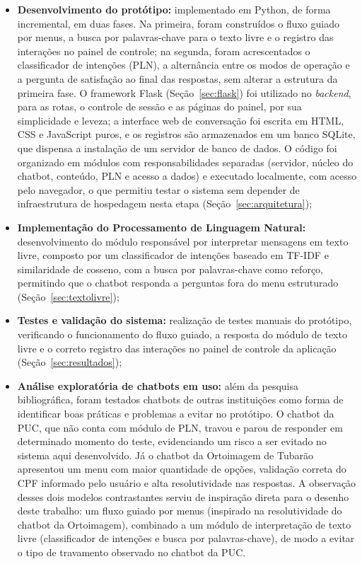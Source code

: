 \documentclass[12pt]{article}
\begin{document}
\begin{itemize}
  \item \textbf{Desenvolvimento do protótipo:} implementado em Python, de
forma incremental, em duas fases. Na primeira, foram construídos o fluxo
guiado por menus, a busca por palavras-chave para o texto livre e o
registro das interações no painel de controle; na segunda, foram
acrescentados o classificador de intenções (PLN), a alternância entre os
modos de operação e a pergunta de satisfação ao final das respostas, sem
alterar a estrutura da primeira fase. O framework Flask
(Seção~\ref{sec:flask}) foi utilizado no \textit{backend}, para as rotas,
o controle de sessão e as páginas do painel, por sua simplicidade e
leveza; a interface web de conversação foi escrita em HTML, CSS e
JavaScript puros, e os registros são armazenados em um banco SQLite, que
dispensa a instalação de um servidor de banco de dados. O código foi
organizado em módulos com responsabilidades separadas (servidor, núcleo do
chatbot, conteúdo, PLN e acesso a dados) e executado localmente, com
acesso pelo navegador, o que permitiu testar o sistema sem depender de
infraestrutura de hospedagem nesta etapa (Seção~\ref{sec:arquitetura});

  \item \textbf{Implementação do Processamento de Linguagem Natural:}
  desenvolvimento do módulo responsável por interpretar mensagens em texto livre, composto por um classificador de intenções baseado em TF-IDF e similaridade de cosseno, com a busca por palavras-chave como reforço, permitindo que o chatbot responda a perguntas fora do menu estruturado (Seção~\ref{sec:textolivre});

  \item \textbf{Testes e validação do sistema:} realização de testes
  manuais do protótipo, verificando o funcionamento do fluxo guiado, a
  resposta do módulo de texto livre e o correto registro das interações
  no painel de controle da aplicação (Seção~\ref{sec:resultados});

  \item \textbf{Análise exploratória de chatbots em uso:} além da
  pesquisa bibliográfica, foram testados chatbots de outras instituições
  como forma de identificar boas práticas e problemas a evitar no
  protótipo. O chatbot da PUC, que não conta com módulo de PLN, travou e
  parou de responder em determinado momento do teste, evidenciando um
  risco a ser evitado no sistema aqui desenvolvido. Já o chatbot da
  Ortoimagem de Tubarão apresentou um menu com maior quantidade de
  opções, validação correta do CPF informado pelo usuário e alta
  resolutividade nas respostas. A observação desses dois modelos
  contrastantes serviu de inspiração direta para o desenho deste
  trabalho: um fluxo guiado por menus (inspirado na resolutividade do
  chatbot da Ortoimagem), combinado a um módulo de interpretação de texto livre (classificador de intenções e busca por palavras-chave), de modo a evitar o tipo de travamento
  observado no chatbot da PUC.
\end{itemize}
\end{document}
